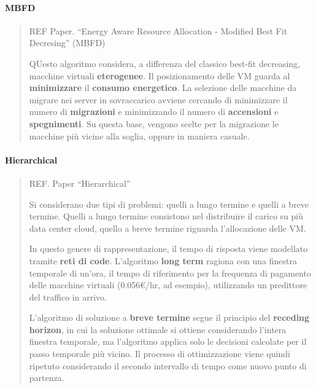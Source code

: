\documentclass{article}
\begin{document}
		\paragraph{MBFD}
		\begin{quote}
		REF Paper. ``Energy Aware Resource Allocation -
		Modified Best Fit Decresing'' (MBFD)
		
		QUesto algoritmo considera, a differenza del classico best-fit decreasing, macchine virtuali \textbf{eterogenee}.
		Il posizionamento delle VM guarda al \textbf{minimizzare} il
		\textbf{consumo energetico}. La selezione delle macchine da migrare nei server
		in sovraccarico avviene cercando di minimizzare il numero
		di \textbf{migrazioni} e minimizzando il numero di \textbf{accensioni} e
		\textbf{spegnimenti}. Su questa base, vengono scelte per la migrazione le
		macchine più vicine alla soglia, oppure in
		maniera casuale.
		\end{quote}
		
		\paragraph{Hierarchical}
		\begin{quote}
		REF. Paper ``Hierarchical''
		
		Si considerano due tipi di problemi: quelli a lungo termine e quelli a
		breve termine. Quelli a lungo termine consistono nel
		distribuire il carico su più data center cloud, quello a
		breve termine riguarda l'allocazione delle VM. 
		
		In questo genere di rappresentazione, il tempo di risposta viene modellato tramite \textbf{reti di
		code}.
		L’algoritmo \textbf{long term} ragiona con una finestra temporale di un’ora, il tempo di
		riferimento per la frequenza di pagamento delle macchine virtuali (0.056€/hr, ad
		esempio), utilizzando un predittore del traffico in arrivo.
		
		L'algoritmo di soluzione a \textbf{breve termine} segue il principio del \textbf{receding horizon}, in cui la soluzione ottimale si ottiene considerando l'intera finestra temporale, ma l'algoritmo applica solo le decisioni calcolate per il passo temporale più vicino. Il processo di ottimizzazione viene quindi ripetuto considerando il secondo intervallo di tempo come nuovo punto di partenza.
		\end{quote}
		
\end{document}
